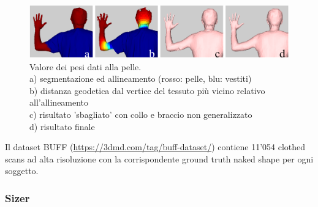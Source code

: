 \begin{figure}[ht!]
  \centering
  \includegraphics[scale=0.5]{Images/IntroductionPic/BUFF.png}
  \caption{Valore dei pesi dati alla pelle. \\ a) segmentazione ed allineamento (rosso: pelle, blu: vestiti) \\ b) distanza geodetica dal vertice del tessuto più vicino relativo all'allineamento \\ c) risultato 'sbagliato' con collo e braccio non generalizzato \\ d) risultato finale}
  \label{fig:BUFF}
\end{figure}

\medskip

Il dataset BUFF (\url{https://3dmd.com/tag/buff-dataset/}) contiene 11’054 clothed scans ad alta risoluzione con la corrispondente ground truth naked shape per ogni soggetto.

\newpage

\subsubsection{Sizer}

